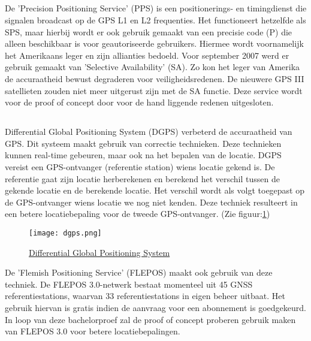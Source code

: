 \subsection{}
De 'Precision Positioning Service' (PPS) is een  positionerings- en timingdienst die signalen broadcast op de GPS L1 en L2 frequenties. Het functioneert hetzelfde als SPS, maar hierbij wordt er ook gebruik gemaakt van een precisie code (P) die alleen beschikbaar is voor geautoriseerde gebruikers. Hiermee wordt voornamelijk het Amerikaans leger en zijn allianties bedoeld. \autocite{pps} Voor september 2007 werd er gebruik gemaakt van 'Selective Availability' (SA). Zo kon het leger van Amerika de accuraatheid bewust degraderen voor veiligheidsredenen. De nieuwere GPS III satellieten zouden niet meer uitgerust zijn met de SA functie. 
\newline
Deze service wordt voor de proof of concept door voor de hand liggende redenen uitgesloten.
\subsection{}
Differential Global Positioning System (DGPS) verbeterd de accuraatheid van GPS. Dit systeem maakt gebruik van correctie technieken. Deze technieken kunnen real-time gebeuren, maar ook na het bepalen van de locatie. DGPS vereist een GPS-ontvanger (referentie station) wiens locatie gekend is. De referentie gaat zijn locatie herberekenen en berekend het verschil tussen de gekende locatie en de berekende locatie. Het verschil wordt als volgt toegepast op de GPS-ontvanger wiens locatie we nog niet kenden. Deze techniek resulteert in een betere locatiebepaling voor de tweede GPS-ontvanger. \autocite{dgps} (Zie figuur:\ref{fig:dgps})
\begin{figure}
	\texttt{[image: dgps.png]}
	\caption{\href{https://www.researchgate.net/figure/Components-of-a-DGPS-System_fig1_252064818}{Differential Global Positioning System}}
	\label{fig:dgps}
\end{figure}
\newline
De 'Flemish Positioning Service' (FLEPOS) maakt ook gebruik van deze techniek. De FLEPOS 3.0-netwerk bestaat momenteel uit 45 GNSS referentiestations, waarvan 33 referentiestations in eigen beheer uitbaat. Het gebruik hiervan is gratis indien de aanvraag voor een abonnement is goedgekeurd. In loop van deze bachelorproef zal de proof of concept proberen gebruik maken van FLEPOS 3.0 voor betere locatiebepalingen. 
